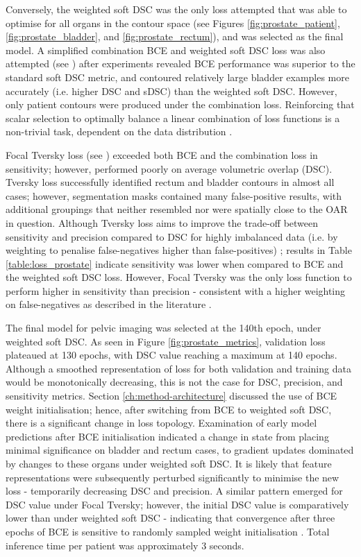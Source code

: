 Conversely, the weighted soft DSC was the only loss attempted that was able to optimise for all organs in the contour space (see Figures \ref{fig:prostate_patient}, \ref{fig:prostate_bladder}, and \ref{fig:prostate_rectum}), and was selected as the final model. A simplified combination BCE and weighted soft DSC loss was also attempted (see \cite{taghanaki2018}) after experiments revealed BCE performance was superior to the standard soft DSC metric, and contoured relatively large bladder examples more accurately (i.e. higher DSC and sDSC) than the weighted soft DSC. However, only patient contours were produced under the combination loss. Reinforcing that scalar selection to optimally balance a linear combination of loss functions is a non-trivial task, dependent on the data distribution \cite{Bertels2019}. 
 
Focal Tversky loss (see \cite{Khan2019}) exceeded both BCE and the combination loss in sensitivity; however, performed poorly on average volumetric overlap (DSC). Tversky loss successfully identified rectum and bladder contours in almost all cases; however, segmentation masks contained many false-positive results, with additional groupings that neither resembled nor were spatially close to the OAR in question. Although Tversky loss aims to improve the trade-off between sensitivity and precision compared to DSC for highly imbalanced data (i.e. by weighting to penalise false-negatives higher than false-positives) \cite{taghanaki2018}; results in Table \ref{table:loss_prostate} indicate sensitivity was lower when compared to BCE and the weighted soft DSC loss. However, Focal Tversky was the only loss function to perform higher in sensitivity than precision - consistent with a higher weighting on false-negatives as described in the literature \cite{Khan2019}.



The final model for pelvic imaging was selected at the 140th epoch, under weighted soft DSC. As seen in Figure \ref{fig:prostate_metrics}, validation loss plateaued at 130 epochs, with DSC value reaching a maximum at 140 epochs. Although a smoothed representation of loss for both validation and training data would be monotonically decreasing, this is not the case for DSC, precision, and sensitivity metrics. Section \ref{ch:method-architecture} discussed the use of BCE weight initialisation; hence, after switching from BCE to weighted soft DSC, there is a significant change in loss topology. Examination of early model predictions after BCE initialisation indicated a change in state from placing minimal significance on bladder and rectum cases, to gradient updates dominated by changes to these organs under weighted soft DSC. It is likely that feature representations were subsequently perturbed significantly to minimise the new loss - temporarily decreasing DSC and precision. A similar pattern emerged for DSC value under Focal Tversky; however, the initial DSC value is comparatively lower than under weighted soft DSC - indicating that convergence after three epochs of BCE is sensitive to randomly sampled weight initialisation \cite{Ronneberger_2015}. Total inference time per patient was approximately 3 seconds.

